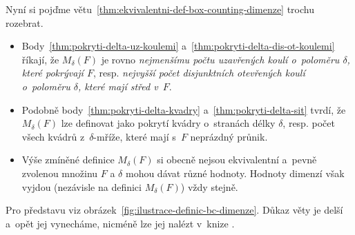 Nyní si pojďme větu~\ref{thm:ekvivalentni-def-box-counting-dimenze} trochu rozebrat.
\begin{itemize}
    \item Body~\ref{thm:pokryti-delta-uz-koulemi} a~\ref{thm:pokryti-delta-dis-ot-koulemi} říkají, že $M_\delta(F)$ je rovno \emph{nejmenšímu počtu uzavřených koulí o~poloměru $\delta$, které pokrývají $F$}, resp. \emph{nejvyšší počet disjunktních otevřených koulí o~poloměru $\delta$, které mají střed v~$F$}.
    \item Podobně body~\ref{thm:pokryti-delta-kvadry} a~\ref{thm:pokryti-delta-sit} tvrdí, že $M_\delta(F)$ lze definovat jako pokrytí kvádry o~stranách délky $\delta$, resp. počet všech kvádrů z~$\delta$-mříže, které mají s~$F$ neprázdný průnik.
    \item Výše zmíněné definice $M_\delta(F)$ si obecně nejsou ekvivalentní a~pevně zvolenou množinu $F$ a $\delta$ mohou dávat různé hodnoty. Hodnoty dimenzí však vyjdou (nezávisle na definici $M_\delta(F)$) vždy stejně.
\end{itemize}
Pro představu viz obrázek~\ref{fig:ilustrace-definic-bc-dimenze}. Důkaz věty je delší a~opět jej vynecháme, nicméně lze jej nalézt v~knize \citep[str. 30]{Falconer2014}.
